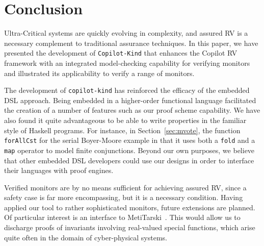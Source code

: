 \section{Conclusion}\label{sec:conclusion}

 Ultra-Critical systems are quickly evolving in complexity, and assured
 RV is a necessary complement to traditional assurance techniques.  
In this paper, we have presented the development of
\texttt{Copilot-Kind} that enhances the Copilot RV framework with an
integrated model-checking capability for verifying monitors and
illustrated its applicability to verify a range of monitors.


The development of \texttt{copilot-kind} has reinforced the efficacy
of the embedded DSL approach. Being embedded in a higher-order
functional language facilitated the creation of a number of features
such as our proof scheme capability. We have also found it quite
advantageous to be able to write properties in the familiar style of
Haskell programs. For instance, in Section~\ref{sec:mvote}, the
function \texttt{forAllCst} for the serial Boyer-Moore example in that
it uses both a \texttt{fold} and a \texttt{map} operator to model
finite conjunctions.  Beyond our own purposes, we believe that other
embedded DSL developers could use our designs in order to interface
their languages with proof engines.

Verified  monitors are by no means sufficient for achieving assured RV,
since a safety case is far more encompassing, but it is a necessary
condition.  Having applied our tool to rather
sophisticated monitors,  future extensions are planned.  Of particular
interest is an interface to 
MetiTarski~\cite{AkbarpourPaulson}. This would allow us to discharge
proofs of invariants involving real-valued special functions, which
arise quite often in the domain of cyber-physical systems.

